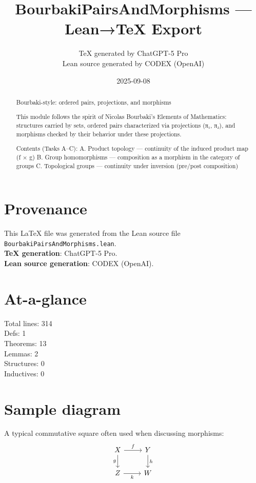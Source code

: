 \documentclass[12pt]{article}
\title{BourbakiPairsAndMorphisms — Lean→TeX Export}
\author{TeX generated by ChatGPT-5 Pro\\Lean source generated by CODEX (OpenAI)}
\date{2025-09-08}
\begin{document}
\maketitle

\begin{abstract}
Bourbaki-style: ordered pairs, projections, and morphisms

  This module follows the spirit of Nicolas Bourbaki's Elements of Mathematics:
  structures carried by sets, ordered pairs characterized via projections (π₁, π₂),
  and morphisms checked by their behavior under these projections.

  Contents (Tasks A–C):
  A. Product topology — continuity of the induced product map (f × g)
  B. Group homomorphisms — composition as a morphism in the category of groups
  C. Topological groups — continuity under inversion (pre/post composition)
\end{abstract}

\section*{Provenance}
This \LaTeX{} file was generated from the Lean source file \texttt{BourbakiPairsAndMorphisms.lean}.\\
\textbf{TeX generation}: ChatGPT-5 Pro.\\
\textbf{Lean source generation}: CODEX (OpenAI).

\section*{At-a-glance}
Total lines: 314\\
Defs: 1\\
Theorems: 13\\
Lemmas: 2\\
Structures: 0\\
Inductives: 0

\section*{Sample diagram}
A typical commutative square often used when discussing morphisms:
\[
\begin{tikzcd}
X \arrow[r, "f"] \arrow[d, "g"'] & Y \arrow[d, "h"] \\
Z \arrow[r, "k"'] & W
\end{tikzcd}
\]
\end{document}
